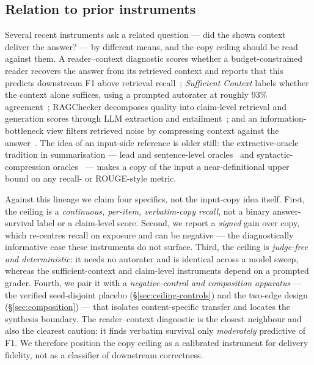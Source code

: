 \documentclass[10pt,twocolumn]{article}
\begin{document}
\subsection{Relation to prior instruments}\label{sec:ceiling-prior}
Several recent instruments ask a related question --- did the shown context deliver the answer? --- by different means, and the copy ceiling should be read against them. A reader--context diagnostic scores whether a budget-constrained reader recovers the answer from its retrieved context and reports that this predicts downstream F1 above retrieval recall~\cite{readercontext2026}; \emph{Sufficient Context} labels whether the context alone suffices, using a prompted autorater at roughly $93\%$ agreement~\cite{sufficientcontext2025}; RAGChecker decomposes quality into claim-level retrieval and generation scores through LLM extraction and entailment~\cite{ragchecker2024}; and an information-bottleneck view filters retrieved noise by compressing context against the answer~\cite{zhu2024ibrag}. The idea of an input-side reference is older still: the extractive-oracle tradition in summarisation --- lead and sentence-level oracles~\cite{see2017pointergenerator,narayan2018xsum} and syntactic-compression oracles~\cite{xu2019extractive} --- makes a copy of the input a near-definitional upper bound on any recall- or ROUGE-style metric.

Against this lineage we claim four specifics, not the input-copy idea itself. First, the ceiling is a \emph{continuous, per-item, verbatim-copy recall}, not a binary answer-survival label or a claim-level score. Second, we report a \emph{signed} gain over copy, which re-centres recall on exposure and can be negative --- the diagnostically informative case these instruments do not surface. Third, the ceiling is \emph{judge-free and deterministic}: it needs no autorater and is identical across a model sweep, whereas the sufficient-context and claim-level instruments depend on a prompted grader. Fourth, we pair it with a \emph{negative-control and composition apparatus} --- the verified seed-disjoint placebo (\S\ref{sec:ceiling-controls}) and the two-edge design (\S\ref{sec:composition}) --- that isolates content-specific transfer and locates the synthesis boundary. The reader--context diagnostic is the closest neighbour and also the clearest caution: it finds verbatim survival only \emph{moderately} predictive of F1. We therefore position the copy ceiling as a calibrated instrument for delivery fidelity, not as a classifier of downstream correctness.
\end{document}

